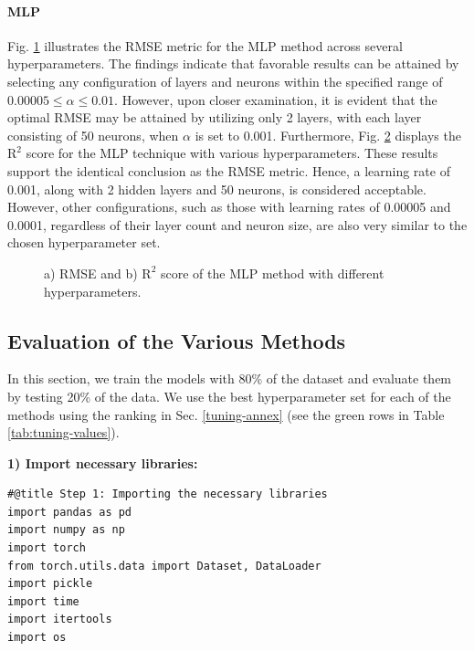 \documentclass[journal,onecolumn]{IEEEtran}
\begin{document}
{\begin{appendices}
\paragraph{MLP}
Fig. \ref{fig:rmse-mlp} illustrates the RMSE metric for the MLP method across several hyperparameters. The findings indicate that favorable results can be attained by selecting any configuration of layers and neurons within the specified range of $0.00005 \le \alpha \le 0.01$. However, upon closer examination, it is evident that the optimal RMSE may be attained by utilizing only 2 layers, with each layer consisting of 50 neurons, when $\alpha$ is set to 0.001. Furthermore, Fig. \ref{fig:r2-mlp}  displays the $\text{R}^2$ score for the MLP technique with various hyperparameters. These results support the identical conclusion as the RMSE metric. Hence, a learning rate of 0.001, along with 2 hidden layers and 50 neurons, is considered acceptable. However, other configurations, such as those with learning rates of 0.00005 and 0.0001, regardless of their layer count and neuron size, are also very similar to the chosen hyperparameter set.

\begin{figure}[htbp]
    \centering
    \begin{subfigure}[b]{0.5\linewidth}
        \centering
        
        \caption{}
        \label{fig:rmse-mlp}
    \end{subfigure}%
    \begin{subfigure}[b]{0.5\linewidth}
        \centering
        
        \caption{}
        \label{fig:r2-mlp}
    \end{subfigure}
    \caption{a) RMSE and b) $\text{R}^2$ score of the MLP method with different hyperparameters.}
    \label{fig:mlp-hypers}
\end{figure}

\clearpage
\subsection{Evaluation of the Various Methods}
In this section, we train the models with 80\% of the dataset and evaluate them by testing 20\% of the data. We use the best hyperparameter set for each of the methods using the ranking in Sec. \ref{tuning-annex} (see the green rows in Table \ref{tab:tuning-values}). 

\textbf{1) Import necessary libraries:}
\begin{verbatim}
#@title Step 1: Importing the necessary libraries
import pandas as pd
import numpy as np
import torch
from torch.utils.data import Dataset, DataLoader
import pickle
import time
import itertools
import os
\end{verbatim}


\end{appendices}}
\end{document}
